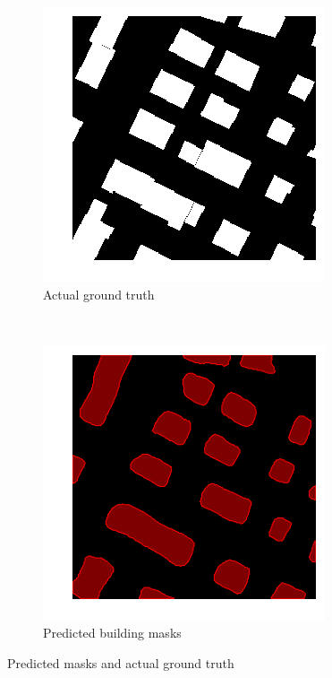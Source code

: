 \begin{figure}[H]
	\centering
	\begin{subfigure}{0.4\textwidth}
    	\includegraphics[width=0.9\linewidth]{chapters/challenges/images/predicted_masks_gt.png}		    \caption{Actual ground truth}
    	\label{fig:challenges:predicted_building_masks_gt}
	\end{subfigure}~
		\begin{subfigure}{0.4\textwidth}
    	\includegraphics[width=0.9\linewidth]{chapters/challenges/images/predicted_masks.png}		    \caption{Predicted building masks}
    	\label{fig:challenges:predicted_building_masks}
	\end{subfigure}
	\caption{Predicted masks and actual ground truth}
	\label{fig:challenges:building_masks}
\end{figure}

